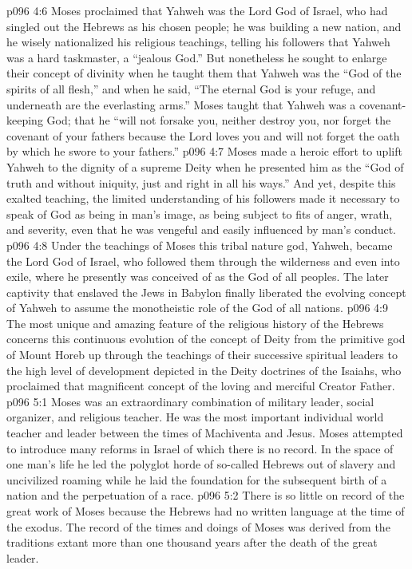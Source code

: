 \vs p096 4:6 Moses proclaimed that Yahweh was the Lord God of Israel, who had singled out the Hebrews as his chosen people; he was building a new nation, and he wisely nationalized his religious teachings, telling his followers that Yahweh was a hard taskmaster, a “jealous God.” But nonetheless he sought to enlarge their concept of divinity when he taught them that Yahweh was the “God of the spirits of all flesh,” and when he said, “The eternal God is your refuge, and underneath are the everlasting arms.” Moses taught that Yahweh was a covenant\hyp{}keeping God; that he “will not forsake you, neither destroy you, nor forget the covenant of your fathers because the Lord loves you and will not forget the oath by which he swore to your fathers.”
\vs p096 4:7 Moses made a heroic effort to uplift Yahweh to the dignity of a supreme Deity when he presented him as the “God of truth and without iniquity, just and right in all his ways.” And yet, despite this exalted teaching, the limited understanding of his followers made it necessary to speak of God as being in man’s image, as being subject to fits of anger, wrath, and severity, even that he was vengeful and easily influenced by man’s conduct.
\vs p096 4:8 Under the teachings of Moses this tribal nature god, Yahweh, became the Lord God of Israel, who followed them through the wilderness and even into exile, where he presently was conceived of as the God of all peoples. The later captivity that enslaved the Jews in Babylon finally liberated the evolving concept of Yahweh to assume the monotheistic role of the God of all nations.
\vs p096 4:9 The most unique and amazing feature of the religious history of the Hebrews concerns this continuous evolution of the concept of Deity from the primitive god of Mount Horeb up through the teachings of their successive spiritual leaders to the high level of development depicted in the Deity doctrines of the Isaiahs, who proclaimed that magnificent concept of the loving and merciful Creator Father.\plusone
{}
\vs p096 5:1 Moses was an extraordinary combination of military leader, social organizer, and religious teacher. He was the most important individual world teacher and leader between the times of Machiventa and Jesus. Moses attempted to introduce many reforms in Israel of which there is no record. In the space of one man’s life he led the polyglot horde of so\hyp{}called Hebrews out of slavery and uncivilized roaming while he laid the foundation for the subsequent birth of a nation and the perpetuation of a race.
\vs p096 5:2 There is so little on record of the great work of Moses because the Hebrews had no written language at the time of the exodus. The record of the times and doings of Moses was derived from the traditions extant more than one thousand years after the death of the great leader.
